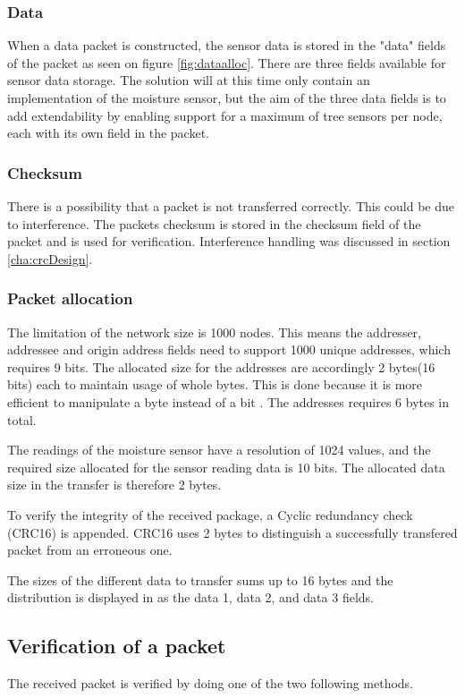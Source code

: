 \subsubsection{Data}
When a data packet is constructed, the sensor data is stored in the "data" fields of the packet as seen on figure \ref{fig:dataalloc}. There are three fields available for sensor data storage. The solution will at this time only contain an implementation of the moisture sensor, but the aim of the three data fields is to add extendability by enabling support for a maximum of tree sensors per node, each with its own field in the packet.


\subsubsection{Checksum}
There is a possibility that a packet is not transferred correctly. This could be due to interference. The packets checksum is stored in the checksum field of the packet and is used for verification. Interference handling was discussed in section \ref{cha:crcDesign}.


\subsubsection{Packet allocation}
The limitation of the network size is 1000 nodes. This means the addresser, addressee and origin address fields need to support 1000 unique addresses, which requires 9 bits. The allocated size for the addresses are accordingly 2 bytes(16 bits) each to maintain usage of whole bytes. This is done because it is more efficient to manipulate a byte instead of a bit \cite{bytevsbit}. The addresses requires 6 bytes in total.

The readings of the moisture sensor have a resolution of 1024 values, and the required size allocated for the sensor reading data is 10 bits. The allocated data size in the transfer is therefore 2 bytes.

To verify the integrity of the received package, a Cyclic redundancy check (CRC16) is appended. CRC16 uses 2 bytes to distinguish a successfully transfered packet from an erroneous one. 

The sizes of the different data to transfer sums up to 16 bytes and the distribution is displayed in  as the data 1, data 2, and data 3 fields.




\subsection{Verification of a packet}
The received packet is verified by doing one of the two following methods. 

